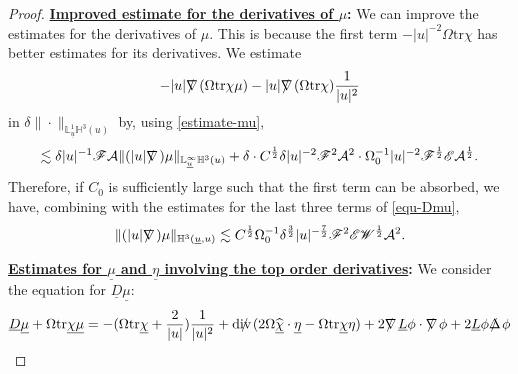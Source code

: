 \documentclass[11pt,reqno]{amsart}
\theoremstyle{definition}
\numberwithin{equation}{section}
\newcommand{\tr}{\mathrm{tr}}
\renewcommand{\L}{\mathbb{L}}
\renewcommand{\H}{\mathbb{H}}
\def\chib{\underline{\chi}}
\def\chibh{\widehat{\underline{\chi}}}
\def\etab{\underline{\eta}}
\def\Lb{\underline{L}}
\def\mub{\underline{\mu}}
\def\tr{\mathrm{tr}}
\def\ub{\underline{u}}
\newcommand{\Db}{\underline{D}}
\def\nablas{\mbox{$\nabla \mkern -13mu /$ }}
\def\Deltas{\mbox{$\Delta \mkern -13mu /$ }}
\def\divs{\mbox{$\mathrm{div} \mkern -13mu /$ }}
\def\ds{\mbox{$\nabla \mkern -13mu /$ }}
\begin{document}
\begin{proof}
{\bf \underline{Improved estimate for the derivatives of $\mu$}:} We can improve the estimates for the derivatives of $\mu$. This is because the first term $-|u|^{-2}\Omega\tr\chi$ has better estimates for its derivatives. We estimate
\begin{align*}
-|u|\nablas(\Omega\tr\chi\mu)-|u|\nablas(\Omega\tr\chi)\frac{1}{|u|^2}
\end{align*}
in $\delta\|\cdot\|_{\L^1_{\ub}\H^3(u)}$ by, using \eqref{estimate-mu},
\begin{align*}
\lesssim\delta|u|^{-1}\mathscr{F}\mathcal{A}\|(|u|\nablas)\mu\|_{\L^\infty_{\ub}\H^3(u)}+\delta\cdot C^{\frac{1}{2}}\delta|u|^{-2}\mathscr{F}^2\mathcal{A}^2\cdot\Omega_0^{-1}|u|^{-2}\mathscr{F}^{\frac{1}{2}}\mathscr{E}\mathcal{A}^{\frac{1}{2}}.
\end{align*}
Therefore, if $C_0$ is sufficiently large such that the first term can be absorbed, we have, combining with the estimates for the last three terms of \eqref{equ-Dmu},
\begin{equation}\label{estimate-nablasmu}
\|(|u|\nablas)\mu\|_{\H^3(\ub,u)}\lesssim C^{\frac{1}{2}}\Omega_0^{-1}\delta^{\frac{3}{2}}|u|^{-\frac{7}{2}}\mathscr{F}^2\mathscr{E}\mathscr{W}^{\frac{1}{2}}\mathcal{A}^2.
\end{equation}


{\bf \underline{Estimates for $\mub$ and $\etab$ involving the top order derivatives}:}  We consider the equation for $\Db\mub$:
\begin{equation}\label{equ-Dbmub}
\Db\mub+\Omega\tr\chib\mub=-(\Omega\tr\chib+\frac{2}{|u|})\frac{1}{|u|^2}+\divs(2\Omega\chibh\cdot\etab-\Omega\tr\chib\eta)+2\nablas \Lb\phi\cdot\ds\phi+2\Lb\phi\Deltas\phi
\end{equation}


\end{proof}
\end{document}
